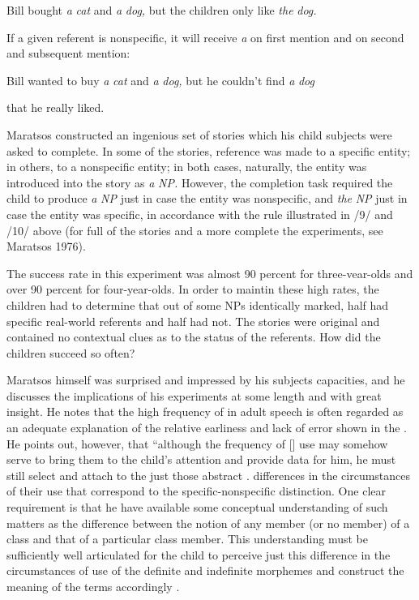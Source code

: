 \ea\label{ex:9}
 Bill bought \textit{a} \textit{cat} and \textit{a} \textit{dog,} but the children only like \textit{the} \textit{dog.}
\glt
\z

If a given referent is nonspecific, it will receive \textit{a} on first mention and on second and subsequent mention:

\ea\label{ex:10}
 Bill wanted to buy \textit{a} \textit{cat} and \textit{a} \textit{dog,} but he couldn't find \textit{a} \textit{dog}
\glt
\z

that he really liked.

Maratsos constructed an ingenious set of stories which his child subjects were asked to complete. In some of the stories, reference was made to a specific entity; in others, to a nonspecific entity; in both cases, naturally, the entity was introduced into the story as \textit{a} \textit{N}\textit{P.} However, the completion task required the child to produce \textit{a} \textit{NP} just in case the entity was nonspecific, and \textit{the} \textit{NP} just in case the entity was specific, in accordance with the rule illustrated in /9/ and /10/ above (for full  of the stories and a more complete  the experiments, see Maratsos 1976).

The success rate in this experiment was almost 90 percent for three-vear-olds and over 90 percent for four-year-olds. In order to maintin these high rates, the children had to determine that out of some NPs identically marked, half had specific real-world referents and half had not. The stories were original and contained no contextual clues as to the status of the referents. How did the children succeed so often?

Maratsos himself was surprised and impressed by his subjects capacities, and he discusses the implications of his experiments at
some length and with great insight. He notes that the high frequency
of  in adult speech is often regarded as an adequate explanation
of the relative earliness and lack of error shown in the  . He points out, however, that ``although the frequency of [] use may somehow serve to bring them to the child's atten\-tion and provide data for him, he must still select and attach to the  just those abstract . differences in the circumstances of their use that correspond to the specific-nonspecific distinction. One clear requirement is that he have available some conceptual understanding of such matters as the difference between the notion of any member (or no member) of a class and that of a particular class member. This understanding must be sufficiently well articulated for the child to perceive just this difference in the circumstances of use of the definite and indefinite morphemes and construct the meaning of the terms accordingly \citep[453]{Maratsos1974}.

